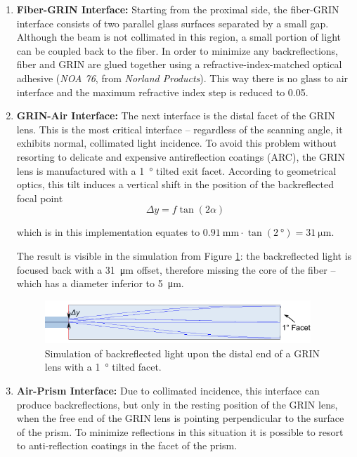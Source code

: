 \begin{enumerate}

\item \textbf{Fiber-GRIN Interface:}
Starting from the proximal side, the fiber-GRIN interface consists of two parallel glass surfaces separated by a small gap. Although the beam is not collimated in this region, a small portion of light can be coupled back to the fiber. In order to minimize any backreflections, fiber and GRIN are glued together using a refractive-index-matched optical adhesive (\textit{NOA 76}, from \textit{Norland Products}). This way there is no glass to air interface and the maximum refractive index step is reduced to \SI{0.05}{}.

\item \textbf{GRIN-Air Interface:}
The next interface is the distal facet of the GRIN lens. This is the most critical interface -- regardless of the scanning angle, it exhibits normal, collimated light incidence. To avoid this problem without resorting to delicate and expensive antireflection coatings (ARC), the GRIN lens is manufactured with a \SI{1}{\degree} tilted exit facet. According to geometrical optics, this tilt induces a vertical shift in the position of the backreflected focal point
\begin{equation}
\Delta y = f \tan(2\alpha)
\end{equation}

which is in this implementation equates to $\SI{0.91}{\milli\meter} \cdot \tan (\SI{2}{\degree}) = \SI{31}{\micro\meter}$.

The result is visible in the simulation from Figure \ref{fig:tilt}: the backreflected light is focused back with a \SI{31}{\micro\meter} offset, therefore missing the core of the fiber -- which has a diameter inferior to \SI{5}{\micro\meter}.

\begin{figure}[h!]\centering
      \includegraphics[width=10cm]{figures/30_DesignSimulation/Optical/backreflection.pdf}
      \caption{Simulation of backreflected light upon the distal end of a GRIN lens with a \SI{1}{\degree} tilted facet.}
      \label{fig:tilt}
\end{figure}

\item \textbf{Air-Prism Interface:} Due to collimated incidence, this interface can produce backreflections, but only in the resting position of the GRIN lens, when the free end of the GRIN lens is pointing perpendicular to the surface of the prism. To minimize reflections in this situation it is possible to resort to anti-reflection coatings in the facet of the prism. 


\end{enumerate}

